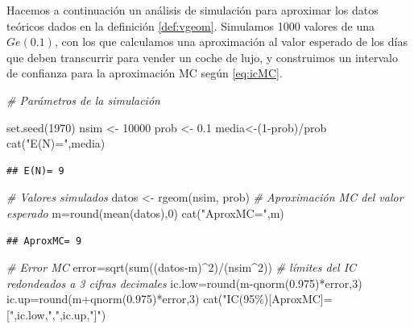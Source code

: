 \documentclass[
]{book}
\newenvironment{Shaded}{\begin{snugshade}}{\end{snugshade}}
\newcommand{\CommentTok}[1]{\textcolor[rgb]{0.56,0.35,0.01}{\textit{#1}}}
\newcommand{\DecValTok}[1]{\textcolor[rgb]{0.00,0.00,0.81}{#1}}
\newcommand{\FloatTok}[1]{\textcolor[rgb]{0.00,0.00,0.81}{#1}}
\newcommand{\FunctionTok}[1]{\textcolor[rgb]{0.00,0.00,0.00}{#1}}
\newcommand{\NormalTok}[1]{#1}
\newcommand{\OtherTok}[1]{\textcolor[rgb]{0.56,0.35,0.01}{#1}}
\newcommand{\SpecialCharTok}[1]{\textcolor[rgb]{0.00,0.00,0.00}{#1}}
\newcommand{\StringTok}[1]{\textcolor[rgb]{0.31,0.60,0.02}{#1}}
\theoremstyle{definition}
\theoremstyle{definition}
\theoremstyle{definition}
\theoremstyle{definition}
\theoremstyle{remark}
\begin{document}
Hacemos a continuación un análisis de simulación para aproximar los datos teóricos dados en la definición \ref{def:vgeom}. Simulamos 1000 valores de una \(Ge(0.1)\), con los que calculamos una aproximación al valor esperado de los días que deben transcurrir para vender un coche de lujo, y construimos un intervalo de confianza para la aproximación MC según \eqref{eq:icMC}.

\begin{Shaded}
\begin{Highlighting}[]
\CommentTok{\# Parámetros de la simulación}

\FunctionTok{set.seed}\NormalTok{(}\DecValTok{1970}\NormalTok{)}
\NormalTok{nsim }\OtherTok{\textless{}{-}} \DecValTok{10000}
\NormalTok{prob }\OtherTok{\textless{}{-}} \FloatTok{0.1}
\NormalTok{media}\OtherTok{\textless{}{-}}\NormalTok{(}\DecValTok{1}\SpecialCharTok{{-}}\NormalTok{prob)}\SpecialCharTok{/}\NormalTok{prob}
\FunctionTok{cat}\NormalTok{(}\StringTok{"E(N)="}\NormalTok{,media)}
\end{Highlighting}
\end{Shaded}

\begin{verbatim}
## E(N)= 9
\end{verbatim}

\begin{Shaded}
\begin{Highlighting}[]
\CommentTok{\# Valores simulados}
\NormalTok{datos }\OtherTok{\textless{}{-}} \FunctionTok{rgeom}\NormalTok{(nsim, prob)}
\CommentTok{\# Aproximación MC del valor esperado}
\NormalTok{m}\OtherTok{=}\FunctionTok{round}\NormalTok{(}\FunctionTok{mean}\NormalTok{(datos),}\DecValTok{0}\NormalTok{)}
\FunctionTok{cat}\NormalTok{(}\StringTok{"AproxMC="}\NormalTok{,m)}
\end{Highlighting}
\end{Shaded}

\begin{verbatim}
## AproxMC= 9
\end{verbatim}

\begin{Shaded}
\begin{Highlighting}[]
\CommentTok{\# Error MC}
\NormalTok{error}\OtherTok{=}\FunctionTok{sqrt}\NormalTok{(}\FunctionTok{sum}\NormalTok{((datos}\SpecialCharTok{{-}}\NormalTok{m)}\SpecialCharTok{\^{}}\DecValTok{2}\NormalTok{)}\SpecialCharTok{/}\NormalTok{(nsim}\SpecialCharTok{\^{}}\DecValTok{2}\NormalTok{))}
\CommentTok{\# límites del IC redondeados a 3 cifras decimales}
\NormalTok{ic.low}\OtherTok{=}\FunctionTok{round}\NormalTok{(m}\SpecialCharTok{{-}}\FunctionTok{qnorm}\NormalTok{(}\FloatTok{0.975}\NormalTok{)}\SpecialCharTok{*}\NormalTok{error,}\DecValTok{3}\NormalTok{)}
\NormalTok{ic.up}\OtherTok{=}\FunctionTok{round}\NormalTok{(m}\SpecialCharTok{+}\FunctionTok{qnorm}\NormalTok{(}\FloatTok{0.975}\NormalTok{)}\SpecialCharTok{*}\NormalTok{error,}\DecValTok{3}\NormalTok{)}
\FunctionTok{cat}\NormalTok{(}\StringTok{"IC(95\%)[AproxMC]=["}\NormalTok{,ic.low,}\StringTok{","}\NormalTok{,ic.up,}\StringTok{"]"}\NormalTok{)}
\end{Highlighting}
\end{Shaded}
\end{document}
